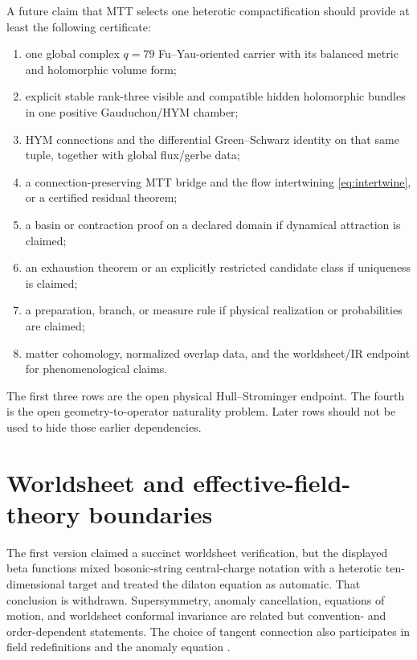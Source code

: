 \documentclass[11pt]{article}
\numberwithin{equation}{section}
\theoremstyle{definition}
\theoremstyle{plain}
\theoremstyle{remark}
\begin{document}
A future claim that MTT selects one heterotic compactification should provide
at least the following certificate:
\begin{enumerate}[label=\textnormal{C\arabic*:},leftmargin=3.4em]
\item one global complex \(q=79\) Fu--Yau-oriented carrier with its balanced
      metric and holomorphic volume form;
\item explicit stable rank-three visible and compatible hidden holomorphic
      bundles in one positive Gauduchon/HYM chamber;
\item HYM connections and the differential Green--Schwarz identity on that
      same tuple, together with global flux/gerbe data;
\item a connection-preserving MTT bridge and the flow intertwining
      \cref{eq:intertwine}, or a certified residual theorem;
\item a basin or contraction proof on a declared domain if dynamical
      attraction is claimed;
\item an exhaustion theorem or an explicitly restricted candidate class if
      uniqueness is claimed;
\item a preparation, branch, or measure rule if physical realization or
      probabilities are claimed;
\item matter cohomology, normalized overlap data, and the worldsheet/IR
      endpoint for phenomenological claims.
\end{enumerate}

The first three rows are the open physical Hull--Strominger endpoint.  The
fourth is the open geometry-to-operator naturality problem.  Later rows
should not be used to hide those earlier dependencies.

\section{Worldsheet and effective-field-theory boundaries}

The first version claimed a succinct worldsheet verification, but the
displayed beta functions mixed bosonic-string central-charge notation with a
heterotic ten-dimensional target and treated the dilaton equation as
automatic.  That conclusion is withdrawn.  Supersymmetry, anomaly
cancellation, equations of motion, and worldsheet conformal invariance are
related but convention- and order-dependent statements.  The choice of
tangent connection also participates in field redefinitions and the anomaly
equation \cite{DelaOssaSvanes2014}.
\end{document}
